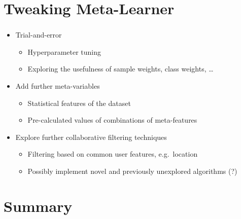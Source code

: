 \documentclass[aspectratio=169]{beamer}
\begin{document}
\section[Outlook]{Tweaking Meta-Learner}
\frame{\vfill\centering\tableofcontents[sectionstyle=show/shaded,subsectionstyle=show/hide]\vfill}

\begin{frame}
	\frametitle{\insertsection}
	\framesubtitle{\insertsubsection}

	\begin{itemize}
		\item Trial-and-error
		\begin{itemize}
			\item Hyperparameter tuning
			\item Exploring the usefulness of sample weights, class weights, \ldots
		\end{itemize}
		\item Add further meta-variables
		\begin{itemize}
			\item Statistical features of the dataset
			\item Pre-calculated values of combinations of meta-features
		\end{itemize}
		\item Explore further collaborative filtering techniques
		\begin{itemize}
			\item Filtering based on common user features, e.g.~location
			\item Possibly implement novel and previously unexplored algorithms (?)
		\end{itemize}
	\end{itemize}
\end{frame}

\section*{Summary}
\end{document}
